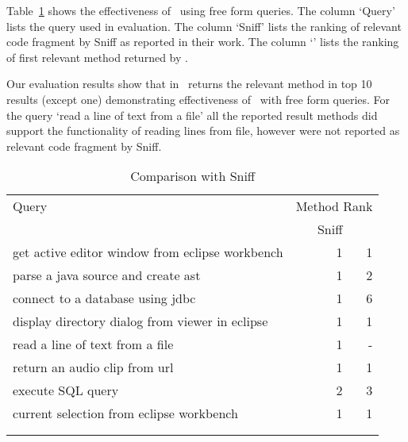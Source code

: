 Table~\ref{tab:SNIFFComp} shows the effectiveness of \tool\ using free form queries.
The column `Query' lists the query used in evaluation.
The column `Sniff' lists the ranking of relevant code fragment by Sniff as reported in their work.
The column `\tool' lists the ranking of first relevant method returned by \tool.


Our evaluation results show that in \tool\ returns the relevant method in top 10 results (except one) demonstrating effectiveness of \tool\ with free form queries. For the query `read a line of text from a file' all the reported result methods did support the functionality of reading lines from file, however were not reported as relevant code fragment by Sniff.

\begin{table}
	\begin{center}	
		\caption{Comparison with Sniff}
		\begin{tabular}{lrr}
			\topline
			\headcol Query	& \multicolumn{2}{c}{Method Rank}\\
			\headcol 		& {\small Sniff}	& {\small \tool} \\
			\midline 
			
			\rowcol get active editor window from eclipse workbench	& 1 & 1\\
			\rowpln parse a java source and create ast & 1 & 2\\
			\rowcol connect to a database using jdbc & 1 & 6\\
			\rowpln display directory dialog from viewer in eclipse & 1 & 1\\
			\rowcol read a line of text from a file & 1 & -\\
			\rowpln return an audio clip from url & 1 & 1\\
			\rowcol execute SQL query & 2 & 3\\
			\rowpln current selection from eclipse workbench & 1 & 1\\ 
			\bottomline
			\rowpln \multicolumn{3}{r}{{\small `-'=No Match in top-10 results.}}\\ 
			\bottomline
		\end{tabular}
		\label{tab:SNIFFComp}
	\end{center}
\end{table}

